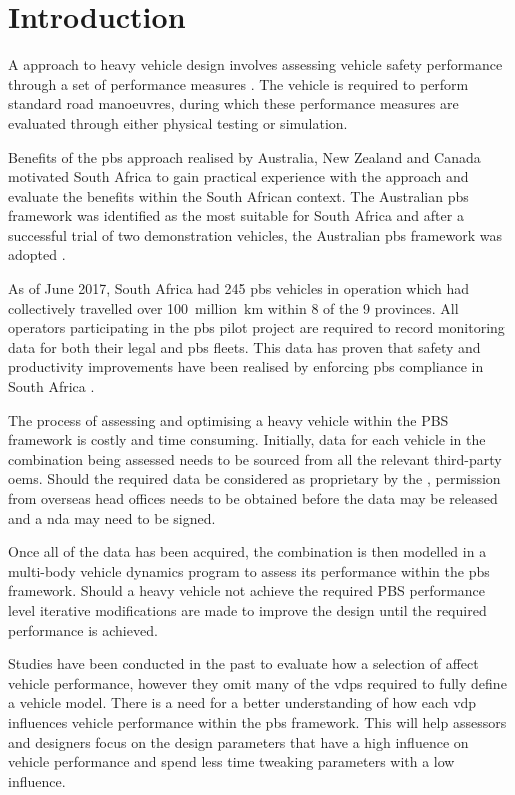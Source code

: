 \chapter{Introduction}\label{chapter:introduction}

A  approach to heavy vehicle design involves assessing vehicle safety performance through a set of performance measures \cite{Arredondo2012}. The vehicle is required to perform standard road manoeuvres, during which these performance measures are evaluated through either physical testing or simulation.

Benefits of the \gls{pbs} approach realised by Australia, New Zealand and Canada motivated South Africa to gain practical experience with the approach and evaluate the benefits within the South African context. The Australian \gls{pbs} framework was identified as the most suitable for South Africa and after a successful trial of two demonstration vehicles, the Australian \gls{pbs} framework was adopted \cite{Nordengen2014}. 

As of June 2017, South Africa had 245 \gls{pbs} vehicles in operation which had collectively travelled over 100~million~km within 8 of the 9 provinces. All operators participating in the \gls{pbs} pilot project are required to record monitoring data for both their legal and \gls{pbs} fleets. This data has proven that safety and productivity improvements have been realised by enforcing \gls{pbs} compliance in South Africa \cite{Nordengen2018}.

The process of assessing and optimising a heavy vehicle within the PBS framework is costly and time consuming. Initially, data for each vehicle in the combination being assessed needs to be sourced from all the relevant third-party \glspl{oem}. Should the required data be considered as proprietary by the , permission from overseas head offices needs to be obtained before the data may be released and a \gls{nda} may need to be signed. 

Once all of the data has been acquired, the combination is then modelled in a multi-body vehicle dynamics program to assess its performance within the \gls{pbs} framework. Should a heavy vehicle not achieve the required PBS performance level iterative modifications are made to improve the design until the required performance is achieved. 

Studies have been conducted in the past to evaluate how a selection of  affect vehicle performance, however they omit many of the \glspl{vdp} required to fully define a vehicle model. There is a need for a better understanding of how each \gls{vdp} influences vehicle performance within the \gls{pbs} framework. This will help assessors and designers focus on the design parameters that have a high influence on vehicle performance and spend less time tweaking parameters with a low influence.

